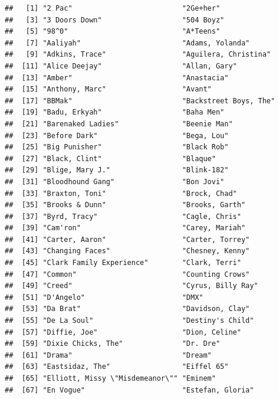 \documentclass[
  11pt]{report}
\begin{document}
\begin{itemize}
\begin{verbatim}
##   [1] "2 Pac"                          "2Ge+her"                       
##   [3] "3 Doors Down"                   "504 Boyz"                      
##   [5] "98^0"                           "A*Teens"                       
##   [7] "Aaliyah"                        "Adams, Yolanda"                
##   [9] "Adkins, Trace"                  "Aguilera, Christina"           
##  [11] "Alice Deejay"                   "Allan, Gary"                   
##  [13] "Amber"                          "Anastacia"                     
##  [15] "Anthony, Marc"                  "Avant"                         
##  [17] "BBMak"                          "Backstreet Boys, The"          
##  [19] "Badu, Erkyah"                   "Baha Men"                      
##  [21] "Barenaked Ladies"               "Beenie Man"                    
##  [23] "Before Dark"                    "Bega, Lou"                     
##  [25] "Big Punisher"                   "Black Rob"                     
##  [27] "Black, Clint"                   "Blaque"                        
##  [29] "Blige, Mary J."                 "Blink-182"                     
##  [31] "Bloodhound Gang"                "Bon Jovi"                      
##  [33] "Braxton, Toni"                  "Brock, Chad"                   
##  [35] "Brooks & Dunn"                  "Brooks, Garth"                 
##  [37] "Byrd, Tracy"                    "Cagle, Chris"                  
##  [39] "Cam'ron"                        "Carey, Mariah"                 
##  [41] "Carter, Aaron"                  "Carter, Torrey"                
##  [43] "Changing Faces"                 "Chesney, Kenny"                
##  [45] "Clark Family Experience"        "Clark, Terri"                  
##  [47] "Common"                         "Counting Crows"                
##  [49] "Creed"                          "Cyrus, Billy Ray"              
##  [51] "D'Angelo"                       "DMX"                           
##  [53] "Da Brat"                        "Davidson, Clay"                
##  [55] "De La Soul"                     "Destiny's Child"               
##  [57] "Diffie, Joe"                    "Dion, Celine"                  
##  [59] "Dixie Chicks, The"              "Dr. Dre"                       
##  [61] "Drama"                          "Dream"                         
##  [63] "Eastsidaz, The"                 "Eiffel 65"                     
##  [65] "Elliott, Missy \"Misdemeanor\"" "Eminem"                        
##  [67] "En Vogue"                       "Estefan, Gloria"               

\end{verbatim}
\end{itemize}
\end{document}
